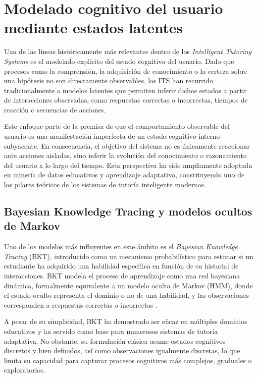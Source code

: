 \documentclass[../main.tex]{subfiles}
\begin{document}
\section{Modelado cognitivo del usuario mediante estados latentes}

Una de las líneas históricamente más relevantes dentro de los \textit{Intelligent Tutoring Systems} es el modelado explícito del estado cognitivo del usuario. Dado que procesos como la comprensión, la adquisición de conocimiento o la certeza sobre una hipótesis no son directamente observables, los ITS han recurrido tradicionalmente a modelos latentes que permiten inferir dichos estados a partir de interacciones observadas, como respuestas correctas o incorrectas, tiempos de reacción o secuencias de acciones.

Este enfoque parte de la premisa de que el comportamiento observable del usuario es una manifestación imperfecta de un estado cognitivo interno subyacente. En consecuencia, el objetivo del sistema no es únicamente reaccionar ante acciones aisladas, sino inferir la evolución del conocimiento o razonamiento del usuario a lo largo del tiempo. Esta perspectiva ha sido ampliamente adoptada en minería de datos educativos y aprendizaje adaptativo, constituyendo uno de los pilares teóricos de los sistemas de tutoría inteligente modernos.

\subsection{Bayesian Knowledge Tracing y modelos ocultos de Markov}

Uno de los modelos más influyentes en este ámbito es el \textit{Bayesian Knowledge Tracing} (BKT), introducido como un mecanismo probabilístico para estimar si un estudiante ha adquirido una habilidad específica en función de su historial de interacciones. BKT modela el proceso de aprendizaje como una red bayesiana dinámica, formalmente equivalente a un modelo oculto de Markov (HMM), donde el estado oculto representa el dominio o no de una habilidad, y las observaciones corresponden a respuestas correctas o incorrectas \cite{BayesianKnowledgeTracing}.

A pesar de su simplicidad, BKT ha demostrado ser eficaz en múltiples dominios educativos y ha servido como base para numerosos sistemas de tutoría adaptativa. No obstante, su formulación clásica asume estados cognitivos discretos y bien definidos, así como observaciones igualmente discretas, lo que limita su capacidad para capturar procesos cognitivos más complejos, graduales o exploratorios.
\end{document}
